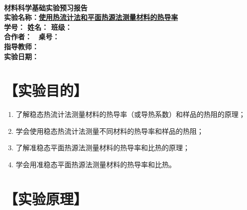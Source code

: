\documentclass[a4paper,utf8]{article}
\begin{document}
\begin{center}
    {\mbox{}\\[7em]\bfseries\songti
    材料科学基础实验预习报告}\\[34mm]
    {\bfseries\songti
    实验名称：\uline{\hfill\mbox{使用热流计法和平面热源法测量材料的热导率}\hfill} \\[2.9mm]
    学\quad 号：\uline{}\hfill
    姓\quad 名：\uline{}\hfill
    班\quad 级：\uline{} \\[2.9mm]
    合作者：\uline{\makebox[25mm]{}}\enspace~
    桌\quad 号：\uline{\makebox[25mm]{}}\hfill\mbox{}\\[2.9mm]
    指导教师：\uline{}\hfill\mbox{} \\[2.9mm]
    实验日期：\uline{\makebox[30mm]{}}\hfill\mbox{} \\[58.7mm]
    }
\end{center}
\newpage
\section*{【实验目的】}
    \begin{enumerate}
        \item 了解稳态热流计法测量材料的热导率（或导热系数）和样品的热阻的原理；
        \item 学会使用稳态热流计法测量不同材料的热导率和样品的热阻；
        \item 了解准稳态平面热源法测量材料的热导率和比热的原理；
        \item 学会用准稳态平面热源法测量材料的热导率和比热。
    \end{enumerate}
\section*{【实验原理】}%
\end{document}
